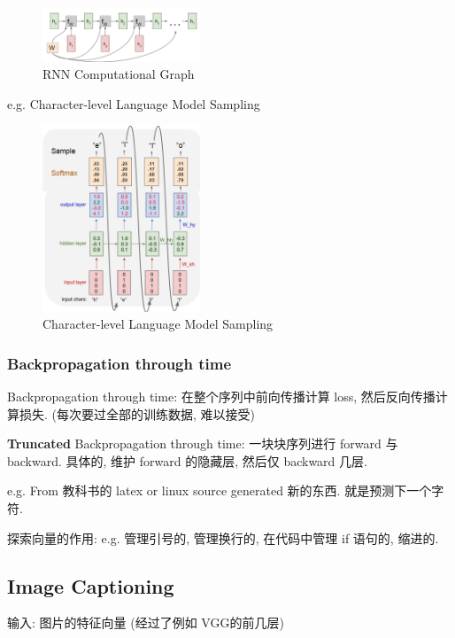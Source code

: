 \begin{figure}[!htb]
    \centering
    \includegraphics[width=0.42\textwidth]{pic/Lec10/RNN Computational Graph}
    \caption{RNN Computational Graph}
\end{figure}

e.g. Character-level Language Model Sampling

\begin{figure}[!htb]
    \centering
    \includegraphics[width=0.42\textwidth]{pic/Lec10/Character-level Language Model Sampling}
    \caption{Character-level Language Model Sampling}
\end{figure}

\subsubsection{Backpropagation through time}
Backpropagation through time: 在整个序列中前向传播计算 loss, 然后反向传播计算损失. (每次要过全部的训练数据, 难以接受)

\textbf{Truncated} Backpropagation through time: 一块块序列进行 forward 与 backward. 具体的, 维护 forward 的隐藏层, 然后仅 backward 几层. 

e.g. From 教科书的 latex or linux source generated 新的东西. 就是预测下一个字符. 

探索向量的作用: e.g. 管理引号的, 管理换行的, 在代码中管理 if 语句的, 缩进的. 

\subsection{Image Captioning}
输入: 图片的特征向量 (经过了例如 VGG的前几层)

